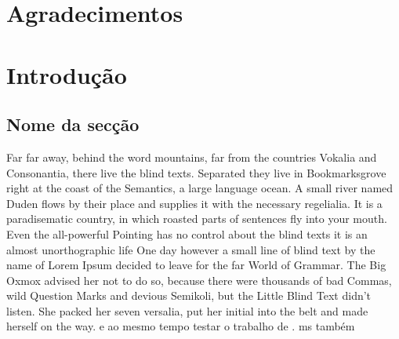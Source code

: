 \documentclass[11pt,a4paper,twoside,openright]{book}
\begin{document}
\begin{sloppy}
\chapter*{Agradecimentos}


%
%
\newpage
\thispagestyle{plain}
\renewcommand{\contentsname}{Índice}
\tableofcontents
\newpage
\thispagestyle{plain}
\listoffigures
\newpage
\thispagestyle{plain}
\listoftables
\clearpage \thispagestyle{plain}\mbox{}\clearpage

\mainmatter

%
%
\newpage
\thispagestyle{plain}
\chapter{Introdução\label{ch:intro}}

\section{Nome da secção}

Far far away, behind the word mountains, far from the countries Vokalia and Consonantia, there live the blind texts. Separated they live in Bookmarksgrove right at the coast of the Semantics, a large language ocean. A small river named Duden flows by their place and supplies it with the necessary regelialia. It is a paradisematic country, in which roasted parts of sentences fly into your mouth. Even the all-powerful Pointing has no control about the blind texts it is an almost unorthographic life One day however a small line of blind text by the name of Lorem Ipsum decided to leave for the far World of Grammar. The Big Oxmox advised her not to do so, because there were thousands of bad Commas, wild Question Marks and devious Semikoli, but the Little Blind Text didn’t listen. She packed her seven versalia, put her initial into the belt and made herself on the way. \citet{Sotomayor2018} e ao mesmo tempo testar o trabalho de \citep{Hollingsworth1999}. \citet{Candidate2014} ms também \citep{Coelli1998} \citet{Grosskopf1987}


\end{sloppy}
\end{document}
